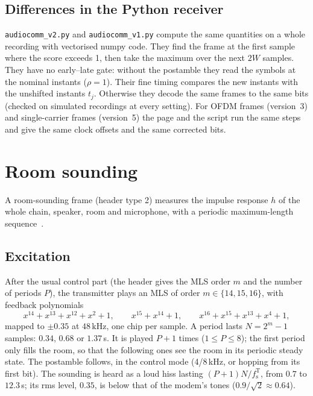 \documentclass[11pt,a4paper]{article}
\newcommand{\kHz}{\,\mathrm{kHz}}
\newcommand{\code}[1]{\texttt{#1}}
\newcommand{\fsT}{f_{\mathrm{s}}^{\mathrm{T}}}
\theoremstyle{remark}
\begin{document}
\subsection{Differences in the Python receiver}
\label{sec:pydiff}
\code{audiocomm\_v2.py} and \code{audiocomm\_v1.py} compute the same quantities on a whole recording with vectorised numpy code. They find the frame at the first sample where the score exceeds 1, then take the maximum over the next $2W$ samples. They have no early--late gate: without the postamble they read the symbols at the nominal instants ($\rho = 1$). Their fine timing compares the new instants with the unshifted instants $t_j$. Otherwise they decode the same frames to the same bits (checked on simulated recordings at every setting). For OFDM frames (version~3) and single-carrier frames (version~5) the page and the script run the same steps and give the same clock offsets and the same corrected bits.

\section{Room sounding}
\label{sec:sounding}
A room-sounding frame (header type 2) measures the impulse response $h$ of the whole chain, speaker, room and microphone, with a periodic maximum-length sequence~\cite{schroeder79,rife}.

\subsection{Excitation}
After the usual control part (the header gives the MLS order $m$ and the number of periods $P$), the transmitter plays an MLS of order $m \in \{14, 15, 16\}$, with feedback polynomials
\begin{equation}
x^{14} + x^{13} + x^{12} + x^{2} + 1, \qquad x^{15} + x^{14} + 1, \qquad x^{16} + x^{15} + x^{13} + x^{4} + 1,
\end{equation}
mapped to $\pm 0.35$ at $48\kHz$, one chip per sample. A period lasts $N = 2^m - 1$ samples: $0.34$, $0.68$ or $1.37$\,s. It is played $P+1$ times ($1 \le P \le 8$); the first period only fills the room, so that the following ones see the room in its periodic steady state. The postamble follows, in the control mode (4/8\,kHz, or hopping from its first bit). The sounding is heard as a loud hiss lasting $(P+1)N/\fsT$, from $0.7$ to $12.3$\,s; its rms level, $0.35$, is below that of the modem's tones ($0.9/\sqrt2 \approx 0.64$).
\end{document}
